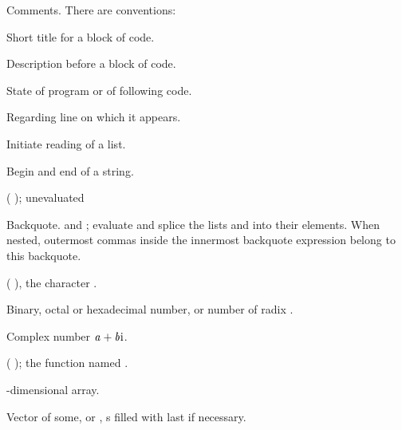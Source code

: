 \begin{LIST}{1cm}

  {
  Comments. There are conventions:
  }
  \begin{LIST}{.5cm}
    {Short title for a block of code.}

    {Description before a block of code.}

    {State of program or of following code.}

    {Regarding line on which it appears.}

  \end{LIST}

  \IT{\KWD*{(}}
  {
  Initiate reading of a list.
  }

  {
  Begin and end of a string.
  }

  {
  ( );  unevaluated
  }

  {
  Backquote.   and ; evaluate 
  and splice the lists  and  into their
  elements. When nested, outermost commas inside the innermost
  backquote expression belong to this backquote.
  }

  {
  ( ), the character .
  }

  {
  Binary, octal or hexadecimal number, or number of radix . 
  }

  {Complex number $\VAR{a}+\VAR{b}\text{i}$.
  }

  {
  ( ); the function named .
  }

  {
  -dimensional array.
  }

  {
  \index{\#(}%
  Vector of some, or ,
  s filled with last  if necessary.
  }


\end{LIST}
